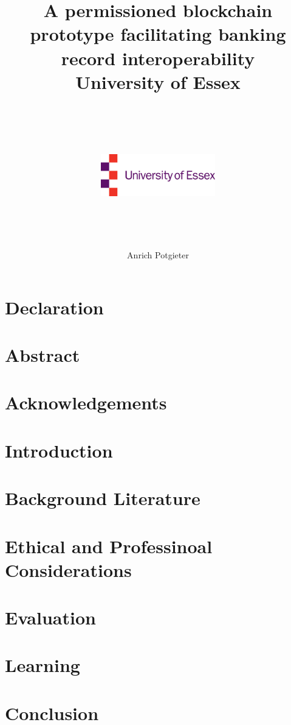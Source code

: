 \documentclass[12pt]{report}
\title{
    {A permissioned blockchain prototype facilitating banking record interoperability}\\
    {\large University of Essex}\\~\\
    {\includegraphics[width=5cm,height=5cm,keepaspectratio]{university.jpg}}
    }
\author{Anrich Potgieter}
\begin{document}
    
    \maketitle

    \tableofcontents
    
    \section*{Declaration}

    \section*{Abstract}

    \section*{Acknowledgements}

    \section{Introduction}

    \section{Background Literature}

    \section{Ethical and Professinoal Considerations}

    \section{Evaluation}

    \section{Learning}

    \section{Conclusion}

    \printbibliography

    \appendix
\end{document}
